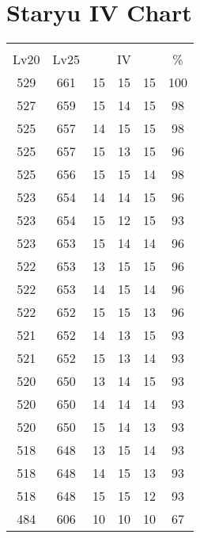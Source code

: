 \documentclass{article}%
\begin{document}
%
\normalsize%
\section{Staryu IV Chart}%
\label{sec:Staryu IV Chart}%
\renewcommand{\arraystretch}{1.5}%
\begin{tabular}{|c|c|c|c|c|c|}%
\hline%
\multicolumn{6}{|c|}{\textcolor{white}{ 
\linebreak{Staryu}
}%
\cellcolor{black}}\\%
\multicolumn{1}{|c}{Lv20}&\multicolumn{1}{c|}{Lv25}&\multicolumn{3}{c|}{IV}&\multicolumn{1}{|c|}{\%}\\%
\hline%
\rowcolor{color100}%
529&661&15&15&15&100\\%
\hline%
\rowcolor{color98}%
527&659&15&14&15&98\\%
\hline%
\rowcolor{color98}%
525&657&14&15&15&98\\%
\hline%
\rowcolor{color96}%
525&657&15&13&15&96\\%
\hline%
\rowcolor{color98}%
525&656&15&15&14&98\\%
\hline%
\rowcolor{color96}%
523&654&14&14&15&96\\%
\hline%
\rowcolor{color93}%
523&654&15&12&15&93\\%
\hline%
\rowcolor{color96}%
523&653&15&14&14&96\\%
\hline%
\rowcolor{color96}%
522&653&13&15&15&96\\%
\hline%
\rowcolor{color96}%
522&653&14&15&14&96\\%
\hline%
\rowcolor{color96}%
522&652&15&15&13&96\\%
\hline%
\rowcolor{color93}%
521&652&14&13&15&93\\%
\hline%
\rowcolor{color93}%
521&652&15&13&14&93\\%
\hline%
\rowcolor{color93}%
520&650&13&14&15&93\\%
\hline%
\rowcolor{color93}%
520&650&14&14&14&93\\%
\hline%
\rowcolor{color93}%
520&650&15&14&13&93\\%
\hline%
\rowcolor{color93}%
518&648&13&15&14&93\\%
\hline%
\rowcolor{color93}%
518&648&14&15&13&93\\%
\hline%
\rowcolor{color93}%
518&648&15&15&12&93\\%
\hline%
\rowcolor{color91}%
484&606&10&10&10&67\\%
\end{tabular}

%
\end{document}
